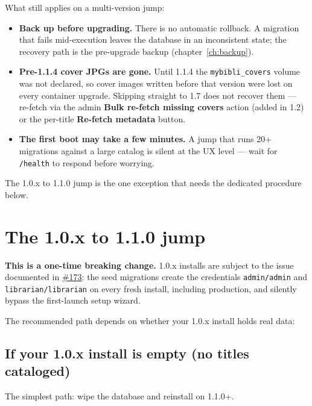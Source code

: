 What still applies on a multi-version jump:

\begin{itemize}
  \item \textbf{Back up before upgrading.} There is no automatic
        rollback. A migration that fails mid-execution leaves the
        database in an inconsistent state; the recovery path is the
        pre-upgrade backup (chapter~\ref{ch:backup}).
  \item \textbf{Pre-1.1.4 cover JPGs are gone.} Until 1.1.4 the
        \texttt{mybibli\_covers} volume was not declared, so cover
        images written before that version were lost on every
        container upgrade. Skipping straight to 1.7 does not
        recover them — re-fetch via the admin \textbf{Bulk
        re-fetch missing covers} action (added in 1.2) or the
        per-title \textbf{Re-fetch metadata} button.
  \item \textbf{The first boot may take a few minutes.} A jump
        that runs 20+ migrations against a large catalog is
        silent at the UX level — wait for \texttt{/health} to
        respond before worrying.
\end{itemize}

The 1.0.x to 1.1.0 jump is the one exception that needs the
dedicated procedure below.

\section{The 1.0.x to 1.1.0 jump}\label{sec:upgrade-1.1.0}

\begin{warning}
\textbf{This is a one-time breaking change.}
1.0.x installs are subject to the issue documented in
\href{https://github.com/guycorbaz/mybibli/issues/173}{\#173}:
the seed migrations create the credentials \texttt{admin/admin}
and \texttt{librarian/librarian} on every fresh install, including
production, and silently bypass the first-launch setup wizard.
\end{warning}

The recommended path depends on whether your 1.0.x install holds
real data:

\subsection*{If your 1.0.x install is empty (no titles cataloged)}

The simplest path: wipe the database and reinstall on 1.1.0+.

